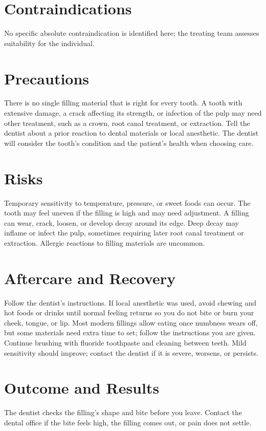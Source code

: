 \section*{Contraindications}
No specific absolute contraindication is identified here; the treating team assesses suitability for the individual.

\section*{Precautions}
There is no single filling material that is right for every tooth. A tooth with extensive damage, a crack affecting its strength, or infection of the pulp may need other treatment, such as a crown, root canal treatment, or extraction. Tell the dentist about a prior reaction to dental materials or local anesthetic. The dentist will consider the tooth's condition and the patient's health when choosing care.

\section*{Risks}
Temporary sensitivity to temperature, pressure, or sweet foods can occur. The tooth may feel uneven if the filling is high and may need adjustment. A filling can wear, crack, loosen, or develop decay around its edge. Deep decay may inflame or infect the pulp, sometimes requiring later root canal treatment or extraction. Allergic reactions to filling materials are uncommon.

\section*{Aftercare and Recovery}
Follow the dentist's instructions. If local anesthetic was used, avoid chewing and hot foods or drinks until normal feeling returns so you do not bite or burn your cheek, tongue, or lip. Most modern fillings allow eating once numbness wears off, but some materials need extra time to set; follow the instructions you are given. Continue brushing with fluoride toothpaste and cleaning between teeth. Mild sensitivity should improve; contact the dentist if it is severe, worsens, or persists.

\section*{Outcome and Results}
The dentist checks the filling's shape and bite before you leave. Contact the dental office if the bite feels high, the filling comes out, or pain does not settle.

